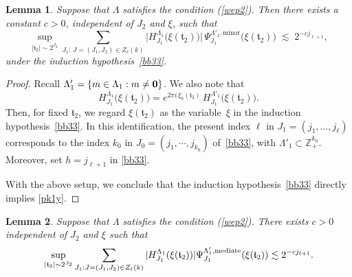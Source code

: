 \documentclass[11 pt,letterpaper]{amsart}
\theoremstyle{plain}
\newtheorem{lemma}{Lemma}\numberwithin{lemma}{section}
\theoremstyle{definition}
\theoremstyle{remark} \theoremstyle{exam} \theoremstyle{ob}
\numberwithin{equation}{section}
\begin{document}
\begin{lemma}\label{prop130y}
Suppose that $\Lambda$ satisfies   the  condition (\ref{wep2}). Then there exists a constant $c>0$, independent of $J_2$ and $\xi$, such that
\begin{equation}\label{pk1y}
\sup_{|\mathfrak{t}_2|\sim 2^{J_2}}
\sum_{J_1:\, J=(J_1,J_2)\in Z_\ell(k)}
\bigl| H^{\Lambda_{1}}_{J_1}\bigl( \xi(\mathfrak{t}_2) \bigr) \bigr|\,
\Psi^{\Lambda'_1,\mathrm{minor}}_{J_1}\bigl(\xi(\mathfrak{t}_2)\bigr)
\;\lesssim\;
2^{-c j_{\ell+1}}, 
\end{equation}under the  induction hypothesis~\eqref{bb33}.
\end{lemma}

\begin{proof}
Recall $\Lambda'_{1}=\{m\in\Lambda_{1}:m\neq {\bf 0}\}$.  We also note that
\[
H^{\Lambda_{1}}_{J_1}\bigl(\xi(\mathfrak{t}_2)\bigr)
=
e^{2\pi i\, \xi_{0}(\mathfrak{t}_2)}\,
H^{\Lambda'_{1}}_{J_1}\bigl(\xi(\mathfrak{t}_2)\bigr).
\]
Then, for fixed $\mathfrak{t}_2$, we regard $\xi(\mathfrak{t}_2)$ as the variable~$\xi$ in the induction hypothesis~\eqref{bb33}.  
In this identification, the present index $\ell$ in $J_1=(j_1,\dots,j_\ell)$ corresponds to the index $k_0$ in $J_0=(j_1,\cdots,j_{k_0})$ of~\eqref{bb33}, with $\Lambda'_1 \subset \mathbb{Z}_+^{k_0}$. Moreover, set $h = j_{\ell+1}$  in \eqref{bb33}.

With the above setup, we conclude that 
the induction hypothesis~\eqref{bb33}  directly implies \eqref{pk1y}.
\end{proof}


 
\begin{lemma}\label{prop41y}
Suppose that $\Lambda$ satisfies   the  condition (\ref{wep2}).  There exists  $c>0$  independent of $J_2$ and $\xi$ such that
\begin{align}\label{32y}
\sup_{|\mathfrak{t}_2|\sim 2^{J_2}}\sum_{J_1: J=(J_1,J_2)\in Z_\ell(k)}   |H^{\Lambda_{1}}_{J_1}( \xi(\mathfrak{t}_2))|  \Psi^{\Lambda'_1,\rm{mediate}}_{J_1}(\xi(\mathfrak{t}_2))  \lesssim 2^{-cj_{\ell+1}}. 
\end{align}
\end{lemma}
 
\end{document}
